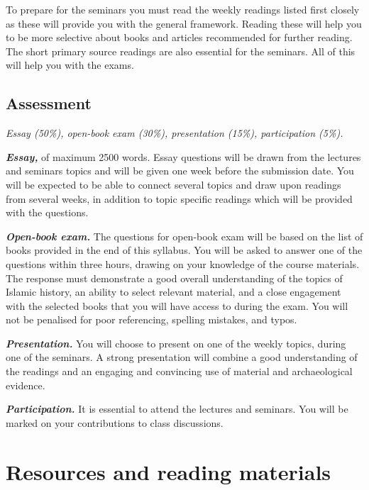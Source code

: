 \documentclass[
]{book}
\begin{document}
To prepare for the seminars you must read the weekly readings listed first closely as these will provide you with the general framework. Reading these will help you to be more selective about books and articles recommended for further reading. The short primary source readings are also essential for the seminars. All of this will help you with the exams.

\hypertarget{assessment}{%
\subsection*{Assessment}\label{assessment}}

\emph{Essay (50\%), open-book exam (30\%), presentation (15\%), participation (5\%).}

\textbf{\emph{Essay,}} of maximum 2500 words. Essay questions will be drawn from the lectures and seminars topics and will be given one week before the submission date. You will be expected to be able to connect several topics and draw upon readings from several weeks, in addition to topic specific readings which will be provided with the questions.

\textbf{\emph{Open-book exam.}} The questions for open-book exam will be based on the list of books provided in the end of this syllabus. You will be asked to answer one of the questions within three hours, drawing on your knowledge of the course materials. The response must demonstrate a good overall understanding of the topics of Islamic history, an ability to select relevant material, and a close engagement with the selected books that you will have access to during the exam. You will not be penalised for poor referencing, spelling mistakes, and typos.

\textbf{\emph{Presentation.}} You will choose to present on one of the weekly topics, during one of the seminars. A strong presentation will combine a good understanding of the readings and an engaging and convincing use of material and archaeological evidence.

\textbf{\emph{Participation.}} It is essential to attend the lectures and seminars. You will be marked on your contributions to class discussions.

\hypertarget{resources-and-reading-materials}{%
\section*{Resources and reading materials}\label{resources-and-reading-materials}}
\end{document}
